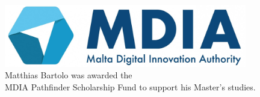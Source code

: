 \pagebreak
\vspace*{\fill} %

\begin{center}
    \includegraphics[width=300pt]{content/figures/mdia.jpg} \\[20pt] %
    {\large Matthias Bartolo was awarded the \\ MDIA Pathfinder Scholarship Fund to support his Master's studies. }
\end{center}

\vspace*{\fill} %
